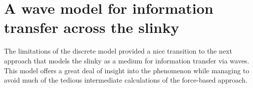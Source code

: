 \documentclass[pre,preprint,superscriptaddress,longbibliography]{revtex4-1}
\begin{document}

\section{A wave model for information transfer across the slinky}
\label{sec:wave}

The limitations of the discrete model provided a nice transition to the next approach that models the slinky as a medium for information transfer via waves.  This model offers a great deal of insight into the phenomenon while
managing to avoid much of the tedious intermediate calculations of the force-based approach. 
\end{document}
